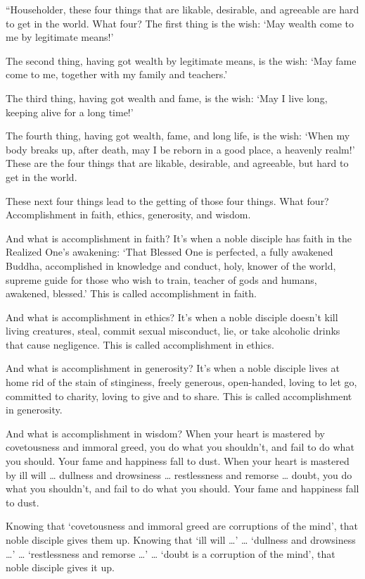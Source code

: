 \documentclass[12pt,openany]{book}%
\begin{document}
“Householder, these four things that are likable, desirable, and agreeable are hard to get in the world. What four? The first thing is the wish: ‘May wealth come to me by legitimate means!’ 

The second thing, having got wealth by legitimate means, is the wish: ‘May fame come to me, together with my family and teachers.’ 

The third thing, having got wealth and fame, is the wish: ‘May I live long, keeping alive for a long time!’ 

The fourth thing, having got wealth, fame, and long life, is the wish: ‘When my body breaks up, after death, may I be reborn in a good place, a heavenly realm!’ These are the four things that are likable, desirable, and agreeable, but hard to get in the world. 

These next four things lead to the getting of those four things. What four? Accomplishment in faith, ethics, generosity, and wisdom. 

And what is accomplishment in faith? It’s when a noble disciple has faith in the Realized One’s awakening: ‘That Blessed One is perfected, a fully awakened Buddha, accomplished in knowledge and conduct, holy, knower of the world, supreme guide for those who wish to train, teacher of gods and humans, awakened, blessed.’ This is called accomplishment in faith. 

And what is accomplishment in ethics? It’s when a noble disciple doesn’t kill living creatures, steal, commit sexual misconduct, lie, or take alcoholic drinks that cause negligence. This is called accomplishment in ethics. 

And what is accomplishment in generosity? It’s when a noble disciple lives at home rid of the stain of stinginess, freely generous, open-handed, loving to let go, committed to charity, loving to give and to share. This is called accomplishment in generosity. 

And what is accomplishment in wisdom? When your heart is mastered by covetousness and immoral greed, you do what you shouldn’t, and fail to do what you should. Your fame and happiness fall to dust. When your heart is mastered by ill will … dullness and drowsiness … restlessness and remorse … doubt, you do what you shouldn’t, and fail to do what you should. Your fame and happiness fall to dust. 

Knowing that ‘covetousness and immoral greed are corruptions of the mind’, that noble disciple gives them up. Knowing that ‘ill will …’ … ‘dullness and drowsiness …’ … ‘restlessness and remorse …’ … ‘doubt is a corruption of the mind’, that noble disciple gives it up. 
\end{document}
